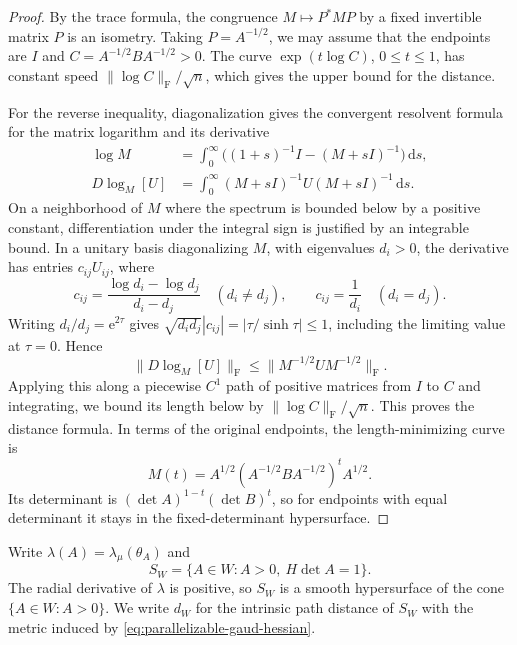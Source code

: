 \begin{proof}
By the trace formula, the congruence $M\mapsto P^*MP$ by a fixed invertible matrix $P$ is an isometry. Taking $P=A^{-1/2}$, we may assume that the endpoints are $I$ and $C=A^{-1/2}BA^{-1/2}>0$. The curve $\exp(t\log C)$, $0\leq t\leq1$, has constant speed $\|\log C\|_{\mathrm F}/\sqrt n$, which gives the upper bound for the distance.

For the reverse inequality, diagonalization gives the convergent resolvent formula for the matrix logarithm and its derivative
\begin{align*}
 \log M&=\int_0^\infty\bigl((1+s)^{-1}I-(M+sI)^{-1}\bigr)\,\mathrm ds,\\
 D\log_M[U]&=\int_0^\infty(M+sI)^{-1}U(M+sI)^{-1}\,\mathrm ds.
\end{align*}
On a neighborhood of $M$ where the spectrum is bounded below by a positive constant, differentiation under the integral sign is justified by an integrable bound. In a unitary basis diagonalizing $M$, with eigenvalues $d_i>0$, the derivative has entries $c_{ij}U_{ij}$, where
\[
 c_{ij}=\frac{\log d_i-\log d_j}{d_i-d_j}\quad(d_i\ne d_j),
 \qquad c_{ij}=\frac1{d_i}\quad(d_i=d_j).
\]
Writing $d_i/d_j=\mathrm e^{2\tau}$ gives $\sqrt{d_id_j}|c_{ij}|=|\tau/\sinh\tau|\leq1$, including the limiting value at $\tau=0$. Hence
\[
 \|D\log_M[U]\|_{\mathrm F}
 \leq\|M^{-1/2}UM^{-1/2}\|_{\mathrm F}.
\]
Applying this along a piecewise $C^1$ path of positive matrices from $I$ to $C$ and integrating, we bound its length below by $\|\log C\|_{\mathrm F}/\sqrt n$. This proves the distance formula. In terms of the original endpoints, the length-minimizing curve is
\begin{equation}\label{eq:positive-matrix-exponential-path}
 M(t)=A^{1/2}(A^{-1/2}BA^{-1/2})^tA^{1/2}.
\end{equation}
Its determinant is $(\det A)^{1-t}(\det B)^t$, so for endpoints with equal determinant it stays in the fixed-determinant hypersurface.
\end{proof}

Write $\lambda(A)=\lambda_\mu(\theta_A)$ and
\[
 S_W=\{A\in W:A>0,\ H\det A=1\}.
\]
The radial derivative of $\lambda$ is positive, so $S_W$ is a smooth hypersurface of the cone $\{A\in W:A>0\}$. We write $d_W$ for the intrinsic path distance of $S_W$ with the metric induced by \eqref{eq:parallelizable-gaud-hessian}.

